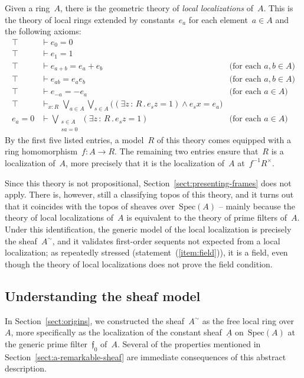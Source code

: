 \documentclass{ws-rv9x6}
\newcommand{\fff}{\mathfrak{f}}
\newcommand{\Spec}{\mathrm{Spec}}
\renewcommand{\_}{\mathpunct{.}}
\newcommand{\?}{\,{:}\,}
\begin{document}
\begin{remark}Given a ring~$A$, there is the geometric theory of \emph{local
localizations} of~$A$. This is the theory of local rings extended by constants~$e_a$
for each element~$a \in A$ and the following axioms:
\begin{align*}
  \top &\vdash e_0 = 0 \\
  \top &\vdash e_1 = 1 \\
  \top &\vdash e_{a + b} = e_a + e_b & \text{(for each~$a,b \in A$)} \\
  \top &\vdash e_{ab} = e_a e_b & \text{(for each~$a,b \in A$)} \\
  \top &\vdash e_{-a} = -e_a & \text{(for each~$a \in A$)} \\
  \top &\vdash_{x:R} \bigvee_{a \in A} \bigvee_{s \in A} \bigl((\exists z\?R\_
  e_s z = 1) \wedge e_s x = e_a\bigr) \\
  e_a = 0 &\vdash \bigvee_{\substack{s \in A\\sa = 0}} (\exists z\?R\_ e_s z = 1) & \text{(for each~$a \in A$)}
\end{align*}
By the first five listed entries, a model~$R$ of this theory comes equipped
with a ring homomorphism~$f : A \to R$. The remaining two entries ensure that~$R$ is
a localization of~$A$, more precisely that it is the localization of~$A$
at~$f^{-1}R^\times$.

Since this theory is not propositional, Section~\ref{sect:presenting-frames}
does not apply. There is, however, still a classifying topos of this theory, and it turns
out that it coincides with the topos of sheaves over~$\Spec(A)$ -- mainly
because the theory of local localizations of~$A$ is equivalent to the theory of
prime filters of~$A$. Under this identification, the generic model of the local
localization is precisely the sheaf~$A^\sim$, and it validates first-order
sequents not expected from a local localization; as repeatedly stressed
(statement~(\ref{item:field})), it is a field, even though the theory of local
localizations does not prove the field condition.
\end{remark}


\subsection{Understanding the sheaf model}
\label{sect:understanding}

In Section~\ref{sect:origins}, we constructed the sheaf~$A^\sim$ as the free
local ring over~$A$, more specifically as the localization of the constant
sheaf~$\underline{A}$ on~$\Spec(A)$ at the generic prime filter~$\fff_0$
of~$A$. Several of the properties mentioned in
Section~\ref{sect:a-remarkable-sheaf} are immediate consequences of this
abstract description.
\end{document}
